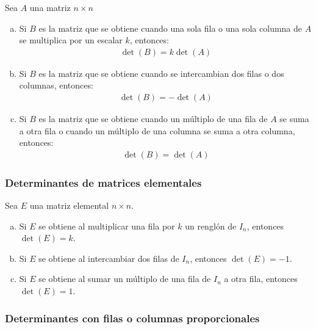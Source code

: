 \documentclass[a4paper,12pt]{article}
\begin{document}
\begin{theorem}
  Sea $A$ una matriz $n\times n$
  \begin{enumerate}[(a)]
    \item Si $B$ es la matriz que se obtiene cuando una sola fila o una sola
      columna de $A$ se multiplica por un escalar $k$, entonces:
      \begin{align*}
        \det(B)=k\det(A)
      \end{align*}
    \item Si $B$ es la matriz que se obtiene cuando se intercambian dos filas
      o dos columnas, entonces:
      \begin{align*}
        \det(B)=-\det(A)
      \end{align*}
    \item Si $B$ es la matriz que se obtiene cuando un múltiplo de una fila de
      $A$ se suma a otra fila o cuando un múltiplo de una columna se suma a
      otra columna, entonces:
      \begin{align*}
        \det(B)=\det(A)
      \end{align*}
  \end{enumerate}
  \label{theo:det_op_elem}
\end{theorem}

\subsubsection{Determinantes de matrices elementales}
\begin{theorem}
  Sea $E$ una matriz elemental $n\times n$.
  \begin{enumerate}[(a)]
    \item Si $E$ se obtiene al multiplicar una fila por $k$ un renglón de
      $I_n$, entonces $\det(E)=k$.
    \item Si $E$ se obtiene al intercambiar dos filas de $I_n$, entonces
      $\det(E)=-1$.
    \item Si $E$ se obtiene al sumar un múltiplo de una fila de $I_n$ a otra
      fila, entonces $\det(E)=1$.
  \end{enumerate}
  \label{theo:det_matr_elem}
\end{theorem}

\subsubsection{Determinantes con filas o columnas proporcionales}
\end{document}
